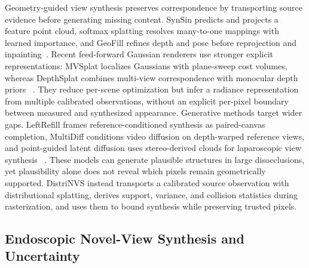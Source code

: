 \documentclass[letterpaper,10pt,conference]{ieeeconf}
\begin{document}
Geometry-guided view synthesis preserves correspondence by transporting source
evidence before generating missing content. SynSin predicts and projects a
feature point cloud, softmax splatting resolves many-to-one mappings with
learned importance, and GeoFill refines depth and pose before reprojection and
inpainting~\cite{wiles2020synsin,niklaus2020softmax,zhao2023geofill}. Recent
feed-forward Gaussian renderers use stronger explicit representations: MVSplat
localizes Gaussians with plane-sweep cost volumes, whereas DepthSplat combines
multi-view correspondence with monocular depth priors
~\cite{chen2024mvsplat,xu2025depthsplat}. They reduce per-scene optimization but
infer a radiance representation from multiple calibrated observations, without
an explicit per-pixel boundary between measured and synthesized appearance.
Generative methods target wider gaps. LeftRefill frames reference-conditioned
synthesis as paired-canvas completion, MultiDiff conditions video diffusion on
depth-warped reference views, and point-guided latent diffusion uses
stereo-derived clouds for laparoscopic view synthesis
~\cite{cao2024leftrefill,muller2024multidiff,tang2025pointguided}. These models can
generate plausible structures in large disocclusions, yet plausibility alone
does not reveal which pixels remain geometrically supported. DistriNVS instead
transports a calibrated source observation with distributional splatting,
derives support, variance, and collision statistics during rasterization, and
uses them to bound synthesis while preserving trusted pixels.

\subsection{Endoscopic Novel-View Synthesis and Uncertainty}
\end{document}
